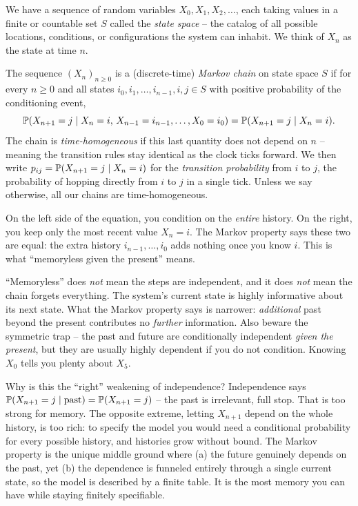We have a sequence of random variables $X_0, X_1, X_2, \dots$,
each taking values in a finite or countable set $S$ called the \emph{state space} -- the catalog
of all possible locations, conditions, or configurations the system can inhabit. We think
of $X_n$ as the state at time $n$.

\begin{definition}
\label{ch23:def-markov}
The sequence $(X_n)_{n \ge 0}$ is a (discrete-time) \emph{Markov chain} on state space $S$
if for every $n \ge 0$ and all states $i_0, i_1, \dots, i_{n-1}, i, j \in S$ with positive
probability of the conditioning event,
\[
  \operatorname{\mathbb{P}}(X_{n+1} = j \mid X_n = i,\, X_{n-1} = i_{n-1}, \dots, X_0 = i_0)
   = \operatorname{\mathbb{P}}(X_{n+1} = j \mid X_n = i).
\]
The chain is \emph{time-homogeneous} if this last quantity does not depend on $n$ -- meaning
the transition rules stay identical as the clock ticks forward. We then write
$p_{ij} = \operatorname{\mathbb{P}}(X_{n+1} = j \mid X_n = i)$ for the \emph{transition probability} from $i$ to $j$,
the probability of hopping directly from $i$ to $j$ in a single tick. Unless we say otherwise,
all our chains are time-homogeneous.
\end{definition}

On the left side of the equation, you condition on the \emph{entire} history. On the
right, you keep only the most recent value $X_n = i$. The Markov property says these two are
equal: the extra history $i_{n-1}, \dots, i_0$ adds nothing once you know $i$. This is what
``memoryless given the present'' means.

\begin{trapbox}
``Memoryless'' does \emph{not} mean the steps are independent, and it does \emph{not} mean
the chain forgets everything. The system's current state is highly informative about its next
state. What the Markov property says is narrower: \emph{additional} past beyond the present
contributes no \emph{further} information. Also beware the symmetric trap -- the past and
future are conditionally independent \emph{given the present}, but they are usually highly
dependent if you do not condition. Knowing $X_0$ tells you plenty about $X_5$.
\end{trapbox}

\begin{whybox}
Why is this the ``right'' weakening of independence? Independence says
$\operatorname{\mathbb{P}}(X_{n+1}=j \mid \text{past}) = \operatorname{\mathbb{P}}(X_{n+1}=j)$ -- the past is irrelevant, full stop.
That is too strong for memory. The opposite extreme, letting $X_{n+1}$ depend on the whole
history, is too rich: to specify the model you would need a conditional probability for every
possible history, and histories grow without bound. The Markov property is the unique
middle ground where (a) the future genuinely depends on the past, yet (b) the dependence is
funneled entirely through a single current state, so the model is described by a finite
table. It is the most memory you can have while staying finitely specifiable.
\end{whybox}

